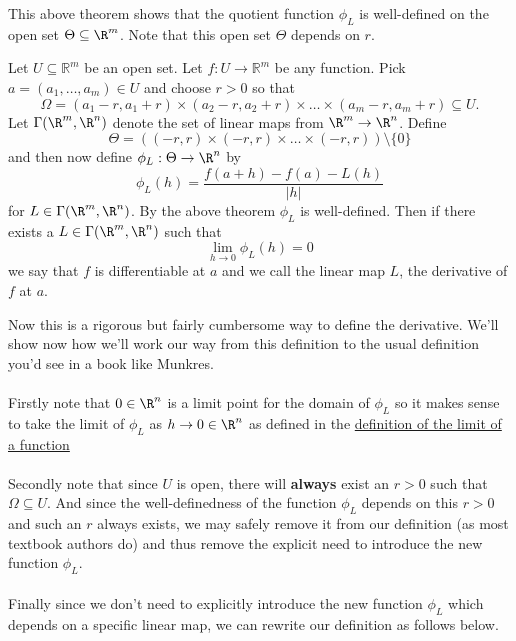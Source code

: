		
		\begin{remark}
			This above theorem shows that the quotient function $\phi_L$ is well-defined on the open set $\Theta \subseteq \R^m$. Note that this open set $\Theta$ depends on $r$.
		\end{remark}
		
			\begin{definition}
				Let $U \subseteq \mathbb{R}^m$ be an open set. Let $f : U \to \mathbb{R}^m$ be any function. Pick $a = (a_1, \dots, a_m) \in U$ and choose $r > 0$ so that $$\Omega = \left(a_1 - r, a_1 + r \right) \times \left(a_2 - r, a_2 + r \right) \times \dots \times \left(a_m - r, a_m + r \right)   \subseteq U.$$ Let $\Gamma(\R^m, \R^n)$ denote the set of linear maps from $\R^m \to \R^n$. Define $$\Theta = \left((-r, r) \times (-r, r) \times \dots \times (-r, r) \right) \setminus \{0\}$$  and then now define $\phi_L : \Theta \to \R^n$ by $$\phi_L(h) = \frac{f(a+h) - f(a) - L(h)}{|h|}$$ for $L \in \Gamma(\R^m, \R^n)$. By the above theorem $\phi_L$ is well-defined. Then if there exists a $L \in \Gamma(\R^m, \R^n)$ such that $$\lim_{h \to 0} \phi_L(h) = 0$$ we say that $f$ is differentiable at $a$ and we call the linear map $L$, the derivative of $f$ at $a$.
			\end{definition}
		
		\begin{remark}
			Now this is a rigorous but fairly cumbersome way to define the derivative. We'll show now how we'll work our way from this definition to the usual definition you'd see in a book like Munkres. 
			\\ \\
			Firstly note that $0 \in \R^n$ is a  limit point for the domain of $\phi_L$ so it makes sense to take the limit of $\phi_L$ as $h \to 0 \in \R^n$ as defined in the \hyperlink{limit-function-defn}{definition of the limit of a function}
			\\ \\
			Secondly note that since $U$ is open, there will \textbf{always} exist an $r > 0$ such that $\Omega \subseteq U$. And since the well-definedness of the function $\phi_L$ depends on this $r > 0$ and such an $r$ always exists, we may safely remove it from our definition (as most textbook authors do) and thus remove the explicit need to introduce the new function $\phi_L$. 
			\\ \\
			Finally since we don't need to explicitly introduce the new function $\phi_L$ which depends on a specific linear map, we can rewrite our definition as follows below.
		\end{remark} 
		
